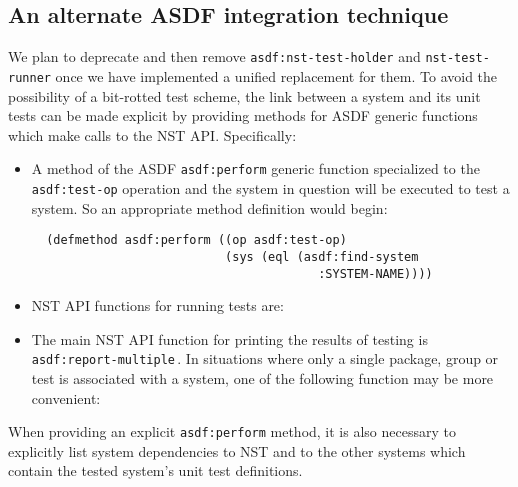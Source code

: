 \subsection{An alternate ASDF integration technique}
We plan to deprecate and then remove \texttt{asdf:nst-test-holder} and
\texttt{nst-test-runner} once we have implemented a unified
replacement for them.  To avoid the possibility of a bit-rotted test
scheme, the link between a system and its unit tests can be made
explicit by providing methods for ASDF generic functions which make
calls to the NST API.  Specifically:
\begin{itemize}
\item A method of the ASDF \texttt{asdf:perform} generic function
  specialized to the \texttt{asdf:test-op} operation and the system in
  question will be executed to test a system.  So an appropriate
  method definition would begin:
  \begin{verbatim}
  (defmethod asdf:perform ((op asdf:test-op)
                           (sys (eql (asdf:find-system
                                        :SYSTEM-NAME))))
\end{verbatim}
\item NST API functions for running tests are:
\item The main NST API function for printing the results of testing is
  \texttt{asdf:report-multiple}\,.  In situations where only a single
  package, group or test is associated with a system, one of the
  following function may be more convenient:
\end{itemize}
When providing an explicit \texttt{asdf:perform} method, it is also
necessary to explicitly list system dependencies to NST and to the
other systems which contain the tested system's unit test definitions.


